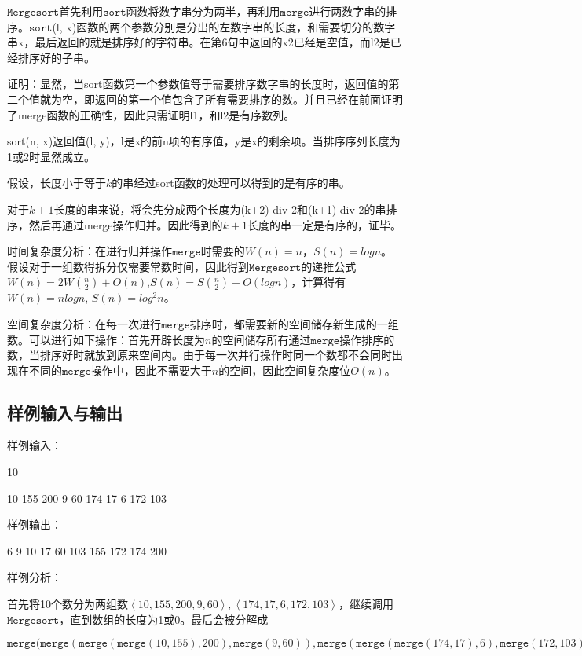 \documentclass[UTF8,a4paperdui, %
]{ctexart}
\begin{document}
$\texttt{Mergesort}$首先利用$\texttt{sort}$函数将数字串分为两半，再利用$\texttt{merge}$进行两数字串的排序。$\texttt{sort}$(l, x)函数的两个参数分别是分出的左数字串的长度，和需要切分的数字串x，最后返回的就是排序好的字符串。在第6句中返回的x2已经是空值，而l2是已经排序好的子串。

证明：显然，当sort函数第一个参数值等于需要排序数字串的长度时，返回值的第二个值就为空，即返回的第一个值包含了所有需要排序的数。并且已经在前面证明了merge函数的正确性，因此只需证明l1，和l2是有序数列。

sort(n, x)返回值(l, y)，l是x的前n项的有序值，y是x的剩余项。当排序序列长度为1或2时显然成立。

假设，长度小于等于$k$的串经过sort函数的处理可以得到的是有序的串。

对于$k+1$长度的串来说，将会先分成两个长度为(k+2) div 2和(k+1) div 2的串排序，然后再通过merge操作归并。因此得到的$k+1$长度的串一定是有序的，证毕。

时间复杂度分析：在进行归并操作$\texttt{merge}$时需要的$W(n)=n$，$S(n)=logn$。假设对于一组数得拆分仅需要常数时间，因此得到$\texttt{Mergesort}$的递推公式$W(n)=2W(\frac{n}{2})+O(n)$,$S(n)=S(\frac{n}{2})+O(logn)$，计算得有$W(n)=nlogn$, $S(n)=log^2n$。

空间复杂度分析：在每一次进行$\texttt{merge}$排序时，都需要新的空间储存新生成的一组数。可以进行如下操作：首先开辟长度为$n$的空间储存所有通过$\texttt{merge}$操作排序的数，当排序好时就放到原来空间内。由于每一次并行操作时同一个数都不会同时出现在不同的$\texttt{merge}$操作中，因此不需要大于$n$的空间，因此空间复杂度位$O(n)$。

\subsection{样例输入与输出}
样例输入：

10

10 155 200 9 60 174 17 6 172 103

样例输出：

6 9 10 17 60 103 155 172 174 200 

样例分析：

首先将10个数分为两组数$\left \langle10,155,200,9,60\right \rangle ,\left \langle 174,17,6,172,103\right \rangle $，继续调用$\texttt{Mergesort}$，直到数组的长度为1或0。最后会被分解成

$\texttt{merge}(\texttt{merge}(\texttt{merge}(\texttt{merge}(10, 155), 200),\texttt{merge}(9, 60)),\texttt{merge}(\texttt{merge}(\texttt{merge}(174,17),6),\texttt{merge}(172,103))$
\end{document}
